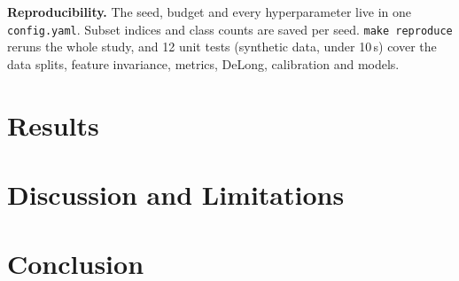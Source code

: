 \documentclass[conference]{IEEEtran}
\begin{document}
\textbf{Reproducibility.} The seed, budget and every hyperparameter live in one \texttt{config.yaml}.
Subset indices and class counts are saved per seed. \texttt{make reproduce} reruns the whole study,
and 12 unit tests (synthetic data, under 10\,s) cover the data splits, feature invariance, metrics,
DeLong, calibration and models.



\section{Results}\label{sec:results}


\section{Discussion and Limitations}\label{sec:discussion}


\section{Conclusion}




\end{document}
